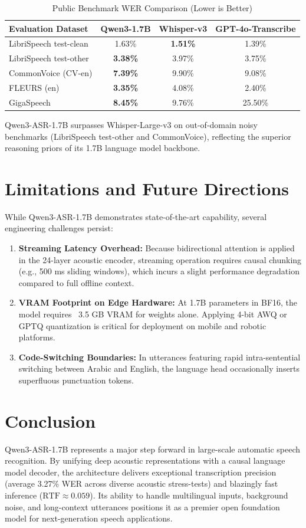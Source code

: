 \documentclass[conference]{IEEEtran}
\begin{document}
\begin{table}[htbp]
\caption{Public Benchmark WER Comparison (Lower is Better)}
\label{tab:benchmarks_external}
\centering
\begin{tabular}{lccc}
\toprule
\textbf{Evaluation Dataset} & \textbf{Qwen3-1.7B} & \textbf{Whisper-v3} & \textbf{GPT-4o-Transcribe} \\
\midrule
LibriSpeech test-clean & 1.63\% & \textbf{1.51\%} & 1.39\% \\
LibriSpeech test-other & \textbf{3.38\%} & 3.97\% & 3.75\% \\
CommonVoice (CV-en) & \textbf{7.39\%} & 9.90\% & 9.08\% \\
FLEURS (en) & \textbf{3.35\%} & 4.08\% & 2.40\% \\
GigaSpeech & \textbf{8.45\%} & 9.76\% & 25.50\% \\
\bottomrule
\end{tabular}
\end{table}

Qwen3-ASR-1.7B surpasses Whisper-Large-v3 on out-of-domain noisy benchmarks (LibriSpeech test-other and CommonVoice), reflecting the superior reasoning priors of its 1.7B language model backbone.

\section{Limitations and Future Directions}
While Qwen3-ASR-1.7B demonstrates state-of-the-art capability, several engineering challenges persist:
\begin{enumerate}
    \item \textbf{Streaming Latency Overhead:} Because bidirectional attention is applied in the 24-layer acoustic encoder, streaming operation requires causal chunking (e.g., 500 ms sliding windows), which incurs a slight performance degradation compared to full offline context.
    \item \textbf{VRAM Footprint on Edge Hardware:} At 1.7B parameters in BF16, the model requires ~3.5 GB VRAM for weights alone. Applying 4-bit AWQ or GPTQ quantization is critical for deployment on mobile and robotic platforms.
    \item \textbf{Code-Switching Boundaries:} In utterances featuring rapid intra-sentential switching between Arabic and English, the language head occasionally inserts superfluous punctuation tokens.
\end{enumerate}

\section{Conclusion}
Qwen3-ASR-1.7B represents a major step forward in large-scale automatic speech recognition. By unifying deep acoustic representations with a causal language model decoder, the architecture delivers exceptional transcription precision (average 3.27\% WER across diverse acoustic stress-tests) and blazingly fast inference ($\text{RTF} \approx 0.059$). Its ability to handle multilingual inputs, background noise, and long-context utterances positions it as a premier open foundation model for next-generation speech applications.
\end{document}
